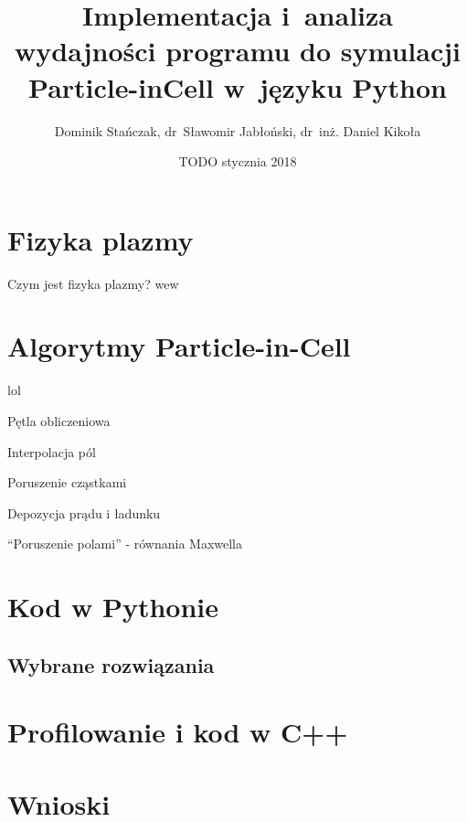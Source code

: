 \documentclass{beamer}
\title[PIC w~Pythonie]{Implementacja i~analiza wydajności programu do symulacji Particle-in\dywiz Cell w~języku Python}
\institute{Politechnika Warszawska}
\author{Dominik Stańczak, dr~Sławomir Jabłoński, dr~inż. Daniel Kikoła}
\date{TODO stycznia 2018}
\begin{document}
    \frame{\titlepage}
    \section{Fizyka plazmy}
        \begin{frame}[t]{Czym jest fizyka plazmy?}
            wew
        \end{frame}
    \section{Algorytmy Particle-in-Cell}
        \begin{frame}
            lol
        \end{frame}

        \begin{frame}[t]{Pętla obliczeniowa}

        \end{frame}

        \begin{frame}[t]{Interpolacja pól}

        \end{frame}

        \begin{frame}[t]{Poruszenie cząstkami}

        \end{frame}

        \begin{frame}[t]{Depozycja prądu i ładunku}

        \end{frame}

        \begin{frame}[t]{``Poruszenie polami'' - równania Maxwella}

        \end{frame}
    \section{Kod w Pythonie}
        \subsection{Wybrane rozwiązania}
            \begin{frame}

            \end{frame}
    \section{Profilowanie i kod w C++}
    \section{Wnioski}
\end{document}
